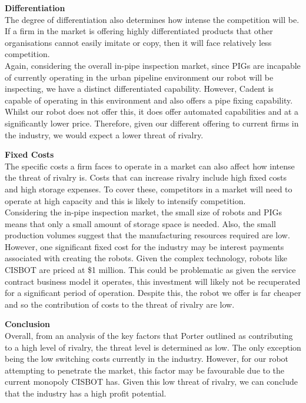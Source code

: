 \documentclass[11pt]{article}		%
\begin{document}
		        \textbf{Differentiation}\\
		        The degree of differentiation also determines how intense the competition will be. If a firm in the market is offering highly differentiated products that other organisations cannot easily imitate or copy, then it will face relatively less competition.\\
		        \hspace*{3ex}Again, considering the overall in-pipe inspection market, since PIGs are incapable of currently operating in the urban pipeline environment our robot will be inspecting, we have a distinct differentiated capability. However, Cadent is capable of operating in this environment and also offers a pipe fixing capability. Whilst our robot does not offer this, it does offer automated capabilities and at a significantly lower price. Therefore, given our different offering to current firms in the industry, we would expect a lower threat of rivalry. 
		        
		        \textbf{Fixed Costs}\\
		        The specific costs a firm faces to operate in a market can also affect how intense the threat of rivalry is. Costs that can increase rivalry include high fixed costs and high storage expenses. To cover these, competitors in a market will need to operate at high capacity and this is likely to intensify competition.\\
		        \hspace*{3ex}Considering the in-pipe inspection market, the small size of robots and PIGs means that only a small amount of storage space is needed. Also, the small production volumes suggest that the manufacturing resources required are low. However, one significant fixed cost for the industry may be interest payments associated with creating the robots. Given the complex technology, robots like CISBOT are priced at \$1 million. This could be problematic as given the service contract business model it operates, this investment will likely not be recuperated for a significant period of operation. Despite this, the robot we offer is far cheaper and so the contribution of costs to the threat of rivalry are low. 
		        
		        \textbf{Conclusion}\\
		        Overall, from an analysis of the key factors that Porter outlined as contributing to a high level of rivalry, the threat level is determined as low. The only exception being the low switching costs currently in the industry. However, for our robot attempting to penetrate the market, this factor may be favourable due to the current monopoly CISBOT has. Given this low threat of rivalry, we can conclude that the industry has a high profit potential.
\end{document}
